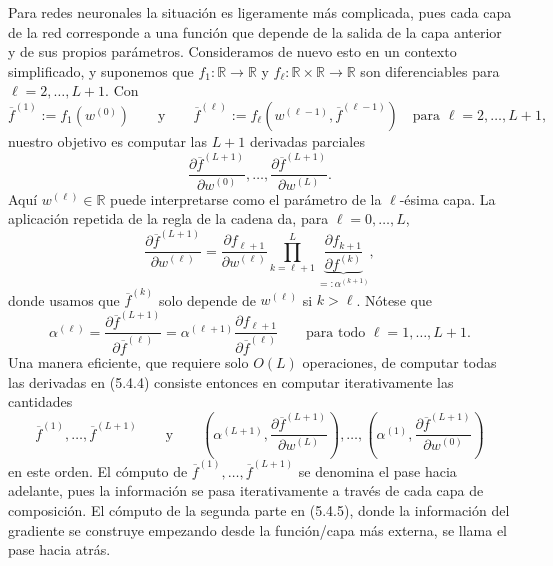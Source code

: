\documentclass[11pt]{report}
\theoremstyle{definition}
\theoremstyle{plain}
\numberwithin{equation}{section}
\begin{document}
Para redes neuronales la situación es ligeramente más complicada, pues cada capa de la red corresponde a una función que depende de la salida de la capa anterior y de sus propios parámetros. Consideramos de nuevo esto en un contexto simplificado, y suponemos que \(f_1:\mathbb{R}\to\mathbb{R}\) y \(f_\ell:\mathbb{R}\times\mathbb{R}\to\mathbb{R}\) son diferenciables para \(\ell=2,\ldots,L+1\). Con
\begin{equation*}
    \overline{f}^{(1)}:=f_1(w^{(0)})
    \qquad
    \text{y}
    \qquad
    \overline{f}^{(\ell)}
    :=
    f_\ell(w^{(\ell-1)},\overline{f}^{(\ell-1)})
    \quad
    \text{para } \ell=2,\ldots,L+1,
\end{equation*}
nuestro objetivo es computar las \(L+1\) derivadas parciales
\begin{equation*}
    \frac{\partial\overline{f}^{(L+1)}}{\partial w^{(0)}},
    \ldots,
    \frac{\partial\overline{f}^{(L+1)}}{\partial w^{(L)}}.
    \tag{5.4.4}
\end{equation*}
Aquí \(w^{(\ell)}\in\mathbb{R}\) puede interpretarse como el parámetro de la \(\ell\)-ésima capa. La aplicación repetida de la regla de la cadena da, para \(\ell=0,\ldots,L\),
\begin{equation*}
    \frac{\partial\overline{f}^{(L+1)}}{\partial w^{(\ell)}}
    =
    \frac{\partial f_{\ell+1}}{\partial w^{(\ell)}}
    \prod_{k=\ell+1}^{L}
    \underbrace{
    \frac{\partial f_{k+1}}{\partial f^{(k)}}
    }_{=:\alpha^{(k+1)}},
\end{equation*}
donde usamos que \(\overline{f}^{(k)}\) solo depende de \(w^{(\ell)}\) si \(k>\ell\). Nótese que
\begin{equation*}
    \alpha^{(\ell)}
    =
    \frac{\partial\overline{f}^{(L+1)}}{\partial\overline{f}^{(\ell)}}
    =
    \alpha^{(\ell+1)}
    \frac{\partial f_{\ell+1}}{\partial\overline{f}^{(\ell)}}
    \qquad
    \text{para todo } \ell=1,\ldots,L+1.
\end{equation*}
Una manera eficiente, que requiere solo \(O(L)\) operaciones, de computar todas las derivadas en (5.4.4) consiste entonces en computar iterativamente las cantidades
\begin{equation*}
    \overline{f}^{(1)},\ldots,\overline{f}^{(L+1)}
    \qquad
    \text{y}
    \qquad
    \left(
        \alpha^{(L+1)},
        \frac{\partial\overline{f}^{(L+1)}}{\partial w^{(L)}}
    \right),
    \ldots,
    \left(
        \alpha^{(1)},
        \frac{\partial\overline{f}^{(L+1)}}{\partial w^{(0)}}
    \right)
    \tag{5.4.5}
\end{equation*}
en este orden. El cómputo de \(\overline{f}^{(1)},\ldots,\overline{f}^{(L+1)}\) se denomina el pase hacia adelante, pues la información se pasa iterativamente a través de cada capa de composición. El cómputo de la segunda parte en (5.4.5), donde la información del gradiente se construye empezando desde la función/capa más externa, se llama el pase hacia atrás.
\end{document}

